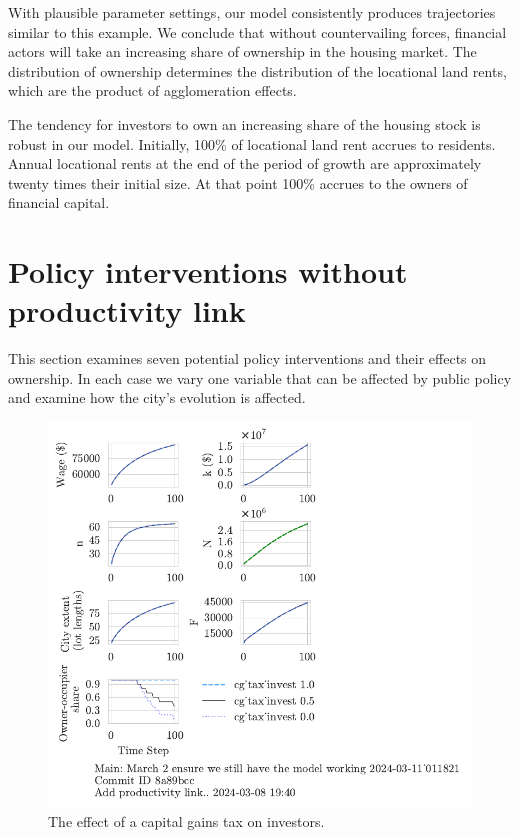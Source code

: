 {With plausible parameter settings, our model consistently produces trajectories similar to this example. We conclude that without countervailing forces, financial actors will take an increasing share of ownership in the housing market. 
The distribution of ownership determines the distribution of the locational land rents, which are the product of agglomeration effects. 

The tendency for investors to own an increasing share of the housing stock is robust in our model. 
Initially, 100\% of locational land rent accrues to residents.   Annual locational rents at the end of the period of growth are approximately twenty times their initial size. At that point 100\% accrues to the owners of financial capital. %

}

\section{Policy interventions without productivity link}


This section examines seven potential policy interventions and their effects on ownership. In each case we vary one  variable that can be affected by public policy and examine how the city's evolution is affected.


\newpage

\begin{figure}[]
    \centering
    \includegraphics[scale=1.2, trim={0 1.4cm 4cm 0},clip]{fig/cg_tax_invest-Main-011821.pdf}
    \caption{The effect of a capital gains tax on investors.}
    \label{fig:CGinvest_ownership_trajectory}
\end{figure}

